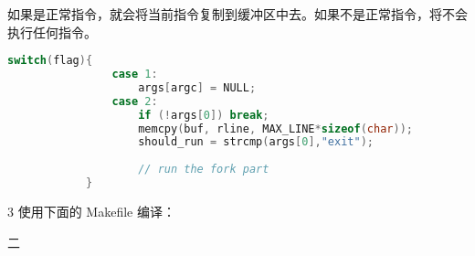 \documentclass[12pt,a4paper]{article}
\newenvironment{problems}{\begin{list}{}{\renewcommand{\makelabel}[1]{\textbf{##1}\hfil}}}{\end{list}}
\newenvironment{steps}{\begin{list}{}{\renewcommand{\makelabel}[1]{##1.\hfil}}}{\end{list}}
\providecommand{\code}[2]{}
\begin{document}
\begin{problems}
\begin{steps}
        如果是正常指令，就会将当前指令复制到缓冲区中去。如果不是正常指令，将不会执行任何指令。
        \begin{lstlisting}[language=c]
            switch(flag){
                case 1:
                    args[argc] = NULL;
                case 2:
                    if (!args[0]) break;
                    memcpy(buf, rline, MAX_LINE*sizeof(char));
                    should_run = strcmp(args[0],"exit");
                    
                    // run the fork part
            }
        \end{lstlisting}

        \item[3]  
        使用下面的 Makefile 编译：
        \code{src/Makefile}{}

    \end{steps} 
    \item[二]  

\end{problems}
\end{document}
